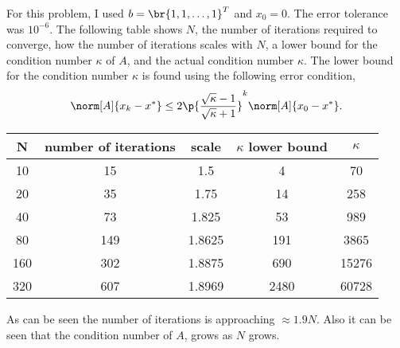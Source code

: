 \documentclass[11pt, oneside]{article}
\begin{document}
\begin{enumerate}
    For this problem, I used $b = \br{1, 1, \ldots, 1}^T$ and $x_0 = 0$.
    The error tolerance was $10^{-6}$.
    The following table shows $N$, the number of iterations required to converge,
    how the number of iterations scales with $N$, a lower bound for the
    condition number $\kappa$ of $A$, and the actual condition number $\kappa$.
    The lower bound for the condition number $\kappa$ is found using the
    following error condition,
    \[
      \norm[A]{x_k - x^*} \le 2\p{\frac{\sqrt{\kappa} - 1}{\sqrt{\kappa} + 1}}^k \norm[A]{x_0 - x^*}.
    \]
    \begin{center}
      \begin{tabular}{ccccc}
        \toprule
        N & number of iterations & scale & $\kappa$ lower bound & $\kappa$\\
        \midrule
         10 &  15 &    1.5 &   4 & 70  \\
         20 &  35 &   1.75 &  14 & 258 \\
         40 &  73 &  1.825 &  53 & 989 \\
         80 & 149 & 1.8625 & 191 & 3865  \\
        160 & 302 & 1.8875 & 690 & 15276 \\
        320 & 607 & 1.8969 &2480 & 60728 \\
        \bottomrule
      \end{tabular}
    \end{center}
    As can be seen the number of iterations is approaching $\approx 1.9 N$.
    Also it can be seen that the condition number of $A$, grows as $N$ grows.
\end{enumerate}
\end{document}
